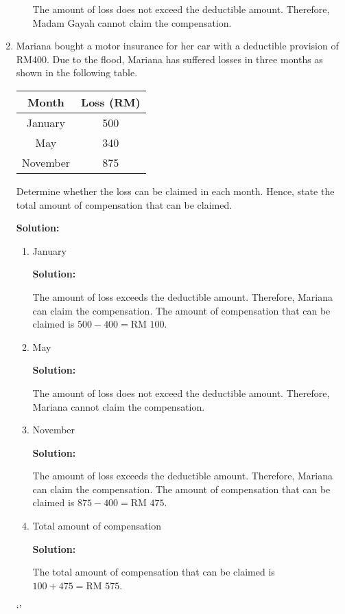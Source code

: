 \documentclass{report}
\newcommand{\sol}{

    \vspace{0.5em}\textbf{Solution:}\vspace{0.5em}}
\begin{document}
\begin{enumerate}
\begin{enumerate}
                    The amount of loss does not exceed the deductible amount. Therefore, Madam
                    Gayah cannot claim the compensation.
          \end{enumerate}

    \item Mariana bought a motor insurance for her car with a deductible provision of
          RM400. Due to the flood, Mariana has suffered losses in three months as shown
          in the following table.

          \begin{tabular}{|c|c|}
              \hline Month    & Loss (RM) \\
              \hline January  & 500       \\
              \hline May      & 340       \\
              \hline November & 875       \\
              \hline
          \end{tabular}

          Determine whether the loss can be claimed in each month. Hence, state the total
          amount of compensation that can be claimed. \sol{}

          \begin{enumerate}
              \item January \sol{}

                    The amount of loss exceeds the deductible amount. Therefore, Mariana can claim
                    the compensation. The amount of compensation that can be claimed is $500 - 400
                        = \text{RM } 100$.

              \item May \sol{}

                    The amount of loss does not exceed the deductible amount. Therefore, Mariana
                    cannot claim the compensation.

              \item November \sol{}

                    The amount of loss exceeds the deductible amount. Therefore, Mariana can claim
                    the compensation. The amount of compensation that can be claimed is $875 - 400
                        = \text{RM } 475$.

              \item Total amount of compensation \sol{}

                    The total amount of compensation that can be claimed is $100 + 475 = \text{RM }
                        575$.
          \end{enumerate}`'


\end{enumerate}
\end{document}
